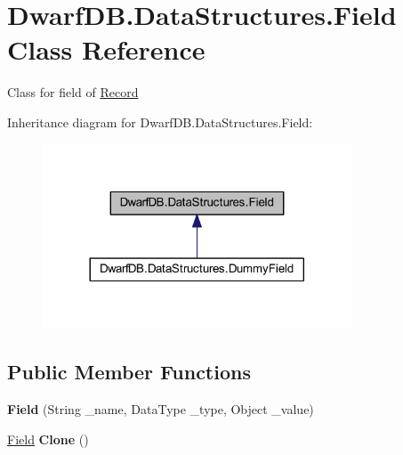 \hypertarget{class_dwarf_d_b_1_1_data_structures_1_1_field}{\section{Dwarf\+D\+B.\+Data\+Structures.\+Field Class Reference}
\label{class_dwarf_d_b_1_1_data_structures_1_1_field}
}


Class for field of \hyperlink{class_dwarf_d_b_1_1_data_structures_1_1_record}{Record}  




Inheritance diagram for Dwarf\+D\+B.\+Data\+Structures.\+Field\+:
\nopagebreak
\begin{figure}[H]
\begin{center}
\leavevmode
\includegraphics[width=260pt]{class_dwarf_d_b_1_1_data_structures_1_1_field__inherit__graph}
\end{center}
\end{figure}
\subsection*{Public Member Functions}
\begin{DoxyCompactItemize}
\item 
\hypertarget{class_dwarf_d_b_1_1_data_structures_1_1_field_af89ec8a20b69b0f52e56c7730eb8127a}{{\bfseries Field} (String \+\_\+name, Data\+Type \+\_\+type, Object \+\_\+value)}\label{class_dwarf_d_b_1_1_data_structures_1_1_field_af89ec8a20b69b0f52e56c7730eb8127a}

\item 
\hypertarget{class_dwarf_d_b_1_1_data_structures_1_1_field_a4772b2645a7b03be6800261db6a3c816}{\hyperlink{class_dwarf_d_b_1_1_data_structures_1_1_field}{Field} {\bfseries Clone} ()}\label{class_dwarf_d_b_1_1_data_structures_1_1_field_a4772b2645a7b03be6800261db6a3c816}

\end{DoxyCompactItemize}

